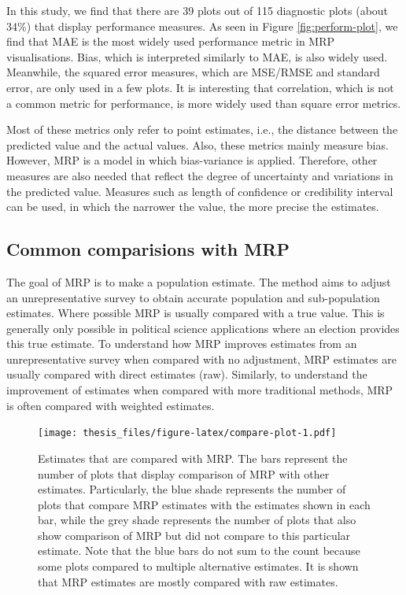 \documentclass{monashthesis}
\begin{document}
In this study, we find that there are 39 plots out of 115 diagnostic plots (about 34\%) that display performance measures. As seen in Figure \ref{fig:perform-plot}, we find that MAE is the most widely used performance metric in MRP visualisations. Bias, which is interpreted similarly to MAE, is also widely used. Meanwhile, the squared error measures, which are MSE/RMSE and standard error, are only used in a few plots. It is interesting that correlation, which is not a common metric for performance, is more widely used than square error metrics.

Most of these metrics only refer to point estimates, i.e., the distance between the predicted value and the actual values. Also, these metrics mainly measure bias. However, MRP is a model in which bias-variance is applied. Therefore, other measures are also needed that reflect the degree of uncertainty and variations in the predicted value. Measures such as length of confidence or credibility interval can be used, in which the narrower the value, the more precise the estimates.

\hypertarget{common-comparisions-with-mrp}{%
\subsection{Common comparisions with MRP}\label{common-comparisions-with-mrp}}

The goal of MRP is to make a population estimate. The method aims to adjust an unrepresentative survey to obtain accurate population and sub-population estimates. Where possible MRP is usually compared with a true value. This is generally only possible in political science applications where an election provides this true estimate. To understand how MRP improves estimates from an unrepresentative survey when compared with no adjustment, MRP estimates are usually compared with direct estimates (raw). Similarly, to understand the improvement of estimates when compared with more traditional methods, MRP is often compared with weighted estimates.

\begin{figure}
\centering
\texttt{[image: thesis\_files/figure-latex/compare-plot-1.pdf]}
\caption{\label{fig:compare-plot}Estimates that are compared with MRP. The bars represent the number of plots that display comparison of MRP with other estimates. Particularly, the blue shade represents the number of plots that compare MRP estimates with the estimates shown in each bar, while the grey shade represents the number of plots that also show comparison of MRP but did not compare to this particular estimate. Note that the blue bars do not sum to the count because some plots compared to multiple alternative estimates. It is shown that MRP estimates are mostly compared with raw estimates.}
\end{figure}
\end{document}
